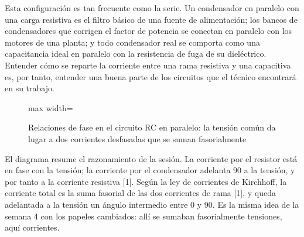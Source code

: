 \documentclass[11pt,letterpaper]{article}
\begin{document}
Esta configuración es tan frecuente como la serie. Un condensador en paralelo con una carga resistiva es el filtro básico de una fuente de alimentación; los bancos de condensadores que corrigen el factor de potencia se conectan en paralelo con los motores de una planta; y todo condensador real se comporta como una capacitancia ideal en paralelo con la resistencia de fuga de su dieléctrico. Entender cómo se reparte la corriente entre una rama resistiva y una capacitiva es, por tanto, entender una buena parte de los circuitos que el técnico encontrará en su trabajo.

\begin{figure}[H]
  \centering
  \begin{adjustbox}{max width=\linewidth}
  \end{adjustbox}
  \caption{Relaciones de fase en el circuito RC en paralelo: la tensión común da lugar a dos corrientes desfasadas que se suman fasorialmente}
\end{figure}

El diagrama resume el razonamiento de la sesión. La corriente por el resistor está en fase con la tensión; la corriente por el condensador adelanta 90\textdegree{} a la tensión, y por tanto a la corriente resistiva [1]. Según la ley de corrientes de Kirchhoff, la corriente total es la suma fasorial de las dos corrientes de rama [1], y queda adelantada a la tensión un ángulo intermedio entre 0\textdegree{} y 90\textdegree{}. Es la misma idea de la semana 4 con los papeles cambiados: allí se sumaban fasorialmente tensiones, aquí corrientes.
\end{document}
